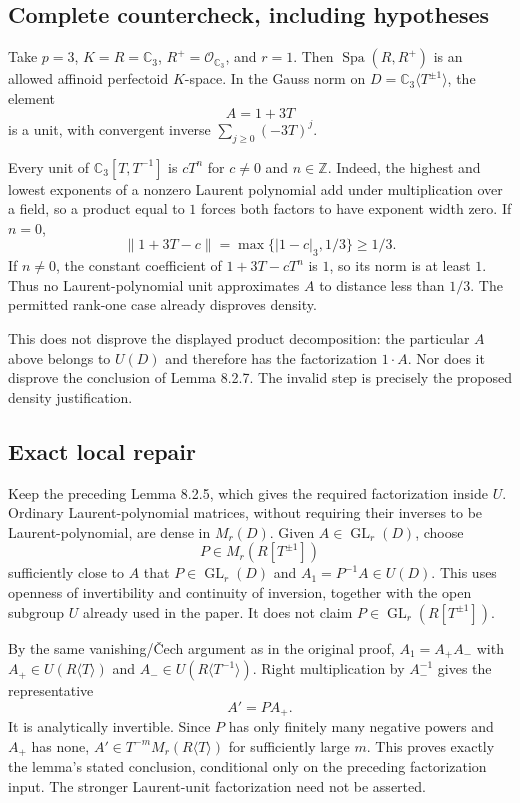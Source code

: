 \documentclass[10pt]{article}
\begin{document}
\subsection*{Complete countercheck, including hypotheses}
Take \(p=3\), \(K=R=\mathbb C_3\), \(R^+=\mathcal O_{\mathbb C_3}\), and \(r=1\). Then \(\operatorname{Spa}(R,R^+)\) is an allowed affinoid perfectoid \(K\)-space. In the Gauss norm on \(D=\mathbb C_3\langle T^{\pm1}\rangle\), the element \[A=1+3T\] is a unit, with convergent inverse \(\sum_{j\geq0}(-3T)^j\).\par
Every unit of \(\mathbb C_3[T,T^{-1}]\) is \(cT^n\) for \(c\ne0\) and \(n\in\mathbb Z\). Indeed, the highest and lowest exponents of a nonzero Laurent polynomial add under multiplication over a field, so a product equal to \(1\) forces both factors to have exponent width zero. If \(n=0\), \[\|1+3T-c\|=\max\{|1-c|_3,1/3\}\geq 1/3.\] If \(n\ne0\), the constant coefficient of \(1+3T-cT^n\) is \(1\), so its norm is at least \(1\). Thus no Laurent-polynomial unit approximates \(A\) to distance less than \(1/3\). The permitted rank-one case already disproves density.\par
This does not disprove the displayed product decomposition: the particular \(A\) above belongs to \(U(D)\) and therefore has the factorization \(1\cdot A\). Nor does it disprove the conclusion of Lemma 8.2.7. The invalid step is precisely the proposed density justification.\par
\subsection*{Exact local repair}
Keep the preceding Lemma 8.2.5, which gives the required factorization inside \(U\). Ordinary Laurent-polynomial matrices, without requiring their inverses to be Laurent-polynomial, are dense in \(M_r(D)\). Given \(A\in\operatorname{GL}_r(D)\), choose \[P\in M_r(R[T^{\pm1}])\] sufficiently close to \(A\) that \(P\in\operatorname{GL}_r(D)\) and \(A_1=P^{-1}A\in U(D)\). This uses openness of invertibility and continuity of inversion, together with the open subgroup \(U\) already used in the paper. It does not claim \(P\in\operatorname{GL}_r(R[T^{\pm1}])\).\par
By the same vanishing/Čech argument as in the original proof, \(A_1=A_+A_-\) with \(A_+\in U(R\langle T\rangle)\) and \(A_-\in U(R\langle T^{-1}\rangle)\). Right multiplication by \(A_-^{-1}\) gives the representative \[A'=PA_+.\] It is analytically invertible. Since \(P\) has only finitely many negative powers and \(A_+\) has none, \(A'\in T^{-m}M_r(R\langle T\rangle)\) for sufficiently large \(m\). This proves exactly the lemma’s stated conclusion, conditional only on the preceding factorization input. The stronger Laurent-unit factorization need not be asserted.\par
\end{document}
